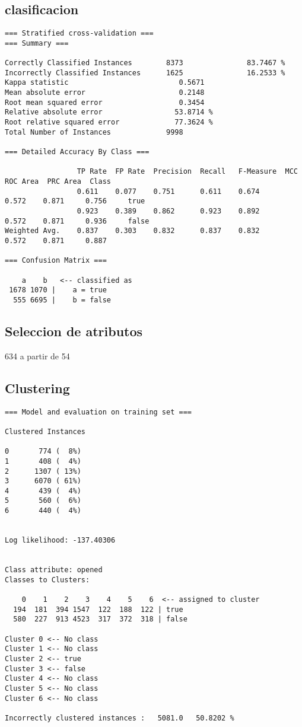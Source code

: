 \documentclass[a4paper]{article}
\begin{document}
\subsection{clasificacion}

\begin{verbatim}
=== Stratified cross-validation ===
=== Summary ===

Correctly Classified Instances        8373               83.7467 %
Incorrectly Classified Instances      1625               16.2533 %
Kappa statistic                          0.5671
Mean absolute error                      0.2148
Root mean squared error                  0.3454
Relative absolute error                 53.8714 %
Root relative squared error             77.3624 %
Total Number of Instances             9998

=== Detailed Accuracy By Class ===

                 TP Rate  FP Rate  Precision  Recall   F-Measure  MCC      ROC Area  PRC Area  Class
                 0.611    0.077    0.751      0.611    0.674      0.572    0.871     0.756     true
                 0.923    0.389    0.862      0.923    0.892      0.572    0.871     0.936     false
Weighted Avg.    0.837    0.303    0.832      0.837    0.832      0.572    0.871     0.887

=== Confusion Matrix ===

    a    b   <-- classified as
 1678 1070 |    a = true
  555 6695 |    b = false
\end{verbatim}

\subsection{Seleccion de atributos}

634 a partir de 54

\subsection{Clustering}

\begin{verbatim}
=== Model and evaluation on training set ===

Clustered Instances

0       774 (  8%)
1       408 (  4%)
2      1307 ( 13%)
3      6070 ( 61%)
4       439 (  4%)
5       560 (  6%)
6       440 (  4%)


Log likelihood: -137.40306


Class attribute: opened
Classes to Clusters:

    0    1    2    3    4    5    6  <-- assigned to cluster
  194  181  394 1547  122  188  122 | true
  580  227  913 4523  317  372  318 | false

Cluster 0 <-- No class
Cluster 1 <-- No class
Cluster 2 <-- true
Cluster 3 <-- false
Cluster 4 <-- No class
Cluster 5 <-- No class
Cluster 6 <-- No class

Incorrectly clustered instances :	5081.0	 50.8202 %
\end{verbatim}
\end{document}
